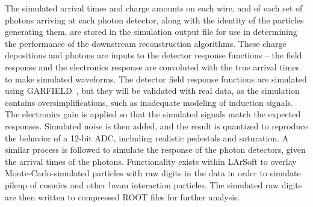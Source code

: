 The simulated arrival times and charge amounts on each wire, and of
each set of photons arriving at each photon detector, along with the
identity of the particles generating them, are stored in the
simulation output file for use in determining the performance of the
downstream reconstruction algorithms.  These charge depositions and
photons are inputs to the detector response functions -- the field
response and the electronics response are convoluted with the true
arrival times to make simulated waveforms.  The detector field
response functions are simulated using GARFIELD~\cite{garfield}, but
they will be validated with real data, as the simulation contains
oversimplifications, such as inadequate modeling of induction signals.  
The electronics gain is applied so that the
simulated signals match the expected responses.  Simulated noise is
then added, and the result is quantized to reproduce the behavior of a
12-bit ADC, including realistic pedestals and saturation.  A similar
process is followed to simulate the response of the photon detectors,
given the arrival times of the photons.  Functionality exists within
LArSoft to overlay Monte-Carlo-simulated particles with raw digits in
the data in order to simulate pileup of cosmics and other beam
interaction particles. The simulated raw digits are then written to
compressed ROOT files for further analysis.

